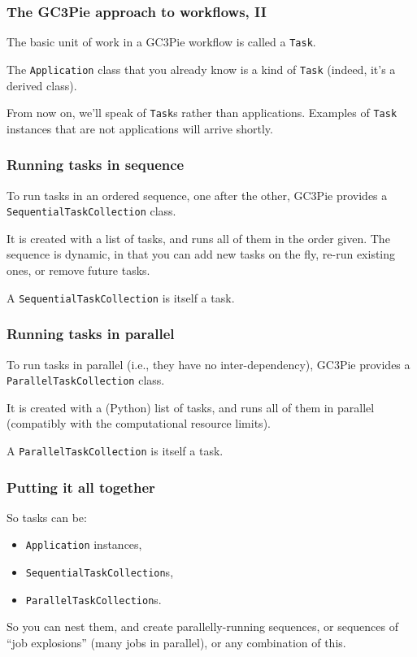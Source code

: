 \documentclass[english,serif,mathserif,xcolor=pdftex,dvipsnames,table]{beamer}
\begin{document}
\begin{frame}
  \frametitle{The GC3Pie approach to workflows, II}

  The basic unit of work in a GC3Pie workflow is called a \texttt{Task}.

  \+
  The \texttt{Application} class that you already know is a kind of
  \texttt{Task} (indeed, it's a derived class).

  \+
  From now on, we'll speak of \texttt{Task}s rather than
  applications.  Examples of \texttt{Task} instances that are not
  applications will arrive shortly.
\end{frame}


\begin{frame}
  \frametitle{Running tasks in sequence}

  To run tasks in an ordered sequence, one after the other, GC3Pie
  provides a \texttt{SequentialTaskCollection} class.

  \+
  It is created with a list of tasks, and runs all of them in the
  order given.  The sequence is dynamic, in that you can add new tasks
  on the fly, re-run existing ones, or remove future tasks.

  \+
  A \texttt{SequentialTaskCollection} is itself a task.
\end{frame}


\begin{frame}
  \frametitle{Running tasks in parallel}

  To run tasks in parallel (i.e., they have no inter-dependency),
  GC3Pie provides a \texttt{ParallelTaskCollection} class.

  \+
  It is created with a (Python) list of tasks, and runs all of them
  in parallel (compatibly with the computational resource limits).

  \+
  A \texttt{ParallelTaskCollection} is itself a task.

\end{frame}


\begin{frame}
  \frametitle{Putting it all together}
  So tasks can be:
  \begin{itemize}
  \item \texttt{Application} instances,
  \item \texttt{SequentialTaskCollection}s,
  \item \texttt{ParallelTaskCollection}s.
  \end{itemize}

  \+
  So you can nest them, and create parallelly-running sequences, or
  sequences of ``job explosions'' (many jobs in parallel), or any
  combination of this.
\end{frame}
\end{document}
